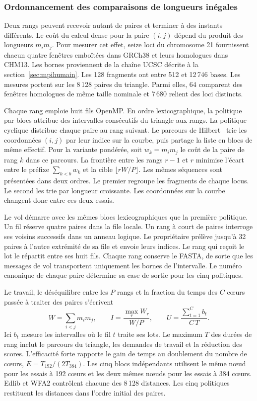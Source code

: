 \subsubsection{Ordonnancement des comparaisons de longueurs inégales}\label{sec:ordonnancement}

Deux rangs peuvent recevoir autant de paires et terminer à des instants différents. Le coût du calcul dense pour la paire \((i,j)\) dépend du produit des longueurs \(m_i m_j\). Pour mesurer cet effet, seize loci du chromosome 21 fournissent chacun quatre fenêtres emboîtées dans GRCh38 et leurs homologues dans CHM13. Les bornes proviennent de la chaîne UCSC décrite à la section~\ref{sec:mpihumain}. Les 128 fragments ont entre 512 et 12\,746 bases. Les mesures portent sur les 8\,128 paires du triangle. Parmi elles, 64 comparent des fenêtres homologues de même taille nominale et 7\,680 relient des loci distincts.

Chaque rang emploie huit fils OpenMP. En ordre lexicographique, la politique par blocs attribue des intervalles consécutifs du triangle aux rangs. La politique cyclique distribue chaque paire au rang suivant. Le parcours de Hilbert~\cite{hilbert} trie les coordonnées \((i,j)\) par leur indice sur la courbe, puis partage la liste en blocs de même effectif. Pour la variante pondérée, soit \(w_k=m_i m_j\) le coût de la paire de rang \(k\) dans ce parcours. La frontière entre les rangs \(r-1\) et \(r\) minimise l’écart entre le préfixe \(\sum_{k<b}w_k\) et la cible \(\lfloor rW/P\rfloor\). Les mêmes séquences sont présentées dans deux ordres. Le premier regroupe les fragments de chaque locus. Le second les trie par longueur croissante. Les coordonnées sur la courbe changent donc entre ces deux essais.

Le vol démarre avec les mêmes blocs lexicographiques que la première politique. Un fil réserve quatre paires dans la file locale. Un rang à court de paires interroge ses voisins successifs dans un anneau logique. Le propriétaire prélève jusqu’à 32 paires à l’autre extrémité de sa file et envoie leurs indices. Le rang qui reçoit le lot le répartit entre ses huit fils. Chaque rang conserve le FASTA, de sorte que les messages de vol transportent uniquement les bornes de l’intervalle. Le numéro canonique de chaque paire détermine sa case de sortie pour les cinq politiques.

Le travail, le déséquilibre entre les \(P\) rangs et la fraction du temps des \(C\) cœurs passée à traiter des paires s’écrivent
\[
  W=\sum_{i<j}m_i m_j,\qquad
  I=\frac{\max_r W_r}{W/P},\qquad
  U=\frac{\sum_{t=1}^{C} b_t}{C\,T}.
\]
Ici \(b_t\) mesure les intervalles où le fil \(t\) traite ses lots. Le maximum \(T\) des durées de rang inclut le parcours du triangle, les demandes de travail et la réduction des scores. L’efficacité forte rapporte le gain de temps au doublement du nombre de cœurs, \(E=T_{192}/(2T_{384})\). Les cinq blocs indépendants utilisent le même nœud pour les essais à 192 cœurs et les deux mêmes nœuds pour les essais à 384 cœurs. Edlib et WFA2 contrôlent chacune des 8\,128 distances. Les cinq politiques restituent les distances dans l’ordre initial des paires.

